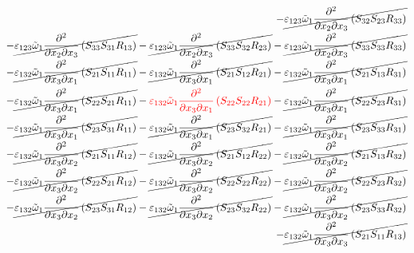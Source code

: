 \begin{equation}
\begin{split}
		-\cancel{\varepsilon_{123}\tilde{\omega}_{1}\pdv{}{x_{2}}{x_{3}}\left(S_{32}S_{23}R_{33}\right)}\\
		-\cancel{\varepsilon_{123}\tilde{\omega}_{1}\pdv{}{x_{2}}{x_{3}}\left(S_{33}S_{31}R_{13}\right)}
		-\cancel{\varepsilon_{123}\tilde{\omega}_{1}\pdv{}{x_{2}}{x_{3}}\left(S_{33}S_{32}R_{23}\right)}
		-\cancel{\varepsilon_{123}\tilde{\omega}_{1}\pdv{}{x_{2}}{x_{3}}\left(S_{33}S_{33}R_{33}\right)}\\
		-\cancel{\varepsilon_{132}\tilde{\omega}_{1}\pdv{}{x_{3}}{x_{1}}\left(S_{21}S_{11}R_{11}\right)}
		-\cancel{\varepsilon_{132}\tilde{\omega}_{1}\pdv{}{x_{3}}{x_{1}}\left(S_{21}S_{12}R_{21}\right)}
		-\cancel{\varepsilon_{132}\tilde{\omega}_{1}\pdv{}{x_{3}}{x_{1}}\left(S_{21}S_{13}R_{31}\right)}\\
		-\cancel{\varepsilon_{132}\tilde{\omega}_{1}\pdv{}{x_{3}}{x_{1}}\left(S_{22}S_{21}R_{11}\right)}
		-{\color{red}\varepsilon_{132}\tilde{\omega}_{1}\pdv{}{x_{3}}{x_{1}}\left(S_{22}S_{22}R_{21}\right)}
		-\cancel{\varepsilon_{132}\tilde{\omega}_{1}\pdv{}{x_{3}}{x_{1}}\left(S_{22}S_{23}R_{31}\right)}\\
		-\cancel{\varepsilon_{132}\tilde{\omega}_{1}\pdv{}{x_{3}}{x_{1}}\left(S_{23}S_{31}R_{11}\right)}
		-\cancel{\varepsilon_{132}\tilde{\omega}_{1}\pdv{}{x_{3}}{x_{1}}\left(S_{23}S_{32}R_{21}\right)}
		-\cancel{\varepsilon_{132}\tilde{\omega}_{1}\pdv{}{x_{3}}{x_{1}}\left(S_{23}S_{33}R_{31}\right)}\\
		-\cancel{\varepsilon_{132}\tilde{\omega}_{1}\pdv{}{x_{3}}{x_{2}}\left(S_{21}S_{11}R_{12}\right)}
		-\cancel{\varepsilon_{132}\tilde{\omega}_{1}\pdv{}{x_{3}}{x_{2}}\left(S_{21}S_{12}R_{22}\right)}
		-\cancel{\varepsilon_{132}\tilde{\omega}_{1}\pdv{}{x_{3}}{x_{2}}\left(S_{21}S_{13}R_{32}\right)}\\
		-\cancel{\varepsilon_{132}\tilde{\omega}_{1}\pdv{}{x_{3}}{x_{2}}\left(S_{22}S_{21}R_{12}\right)}
		-\cancel{\varepsilon_{132}\tilde{\omega}_{1}\pdv{}{x_{3}}{x_{2}}\left(S_{22}S_{22}R_{22}\right)}
		-\cancel{\varepsilon_{132}\tilde{\omega}_{1}\pdv{}{x_{3}}{x_{2}}\left(S_{22}S_{23}R_{32}\right)}\\
		-\cancel{\varepsilon_{132}\tilde{\omega}_{1}\pdv{}{x_{3}}{x_{2}}\left(S_{23}S_{31}R_{12}\right)}
		-\cancel{\varepsilon_{132}\tilde{\omega}_{1}\pdv{}{x_{3}}{x_{2}}\left(S_{23}S_{32}R_{22}\right)}
		-\cancel{\varepsilon_{132}\tilde{\omega}_{1}\pdv{}{x_{3}}{x_{2}}\left(S_{23}S_{33}R_{32}\right)}\\
		-\cancel{\varepsilon_{132}\tilde{\omega}_{1}\pdv{}{x_{3}}{x_{3}}\left(S_{21}S_{11}R_{13}\right)}

\end{split}
\end{equation}
